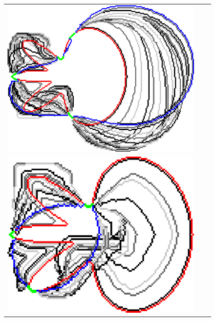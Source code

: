 \begin{figure}
\begin{tabular}{ccc}
\includegraphics[scale=0.25]{figures/chapter5/fixed-pixels/elastica/len_pen_0.001/flower-1/summary.pdf}\\[2em]
\includegraphics[scale=0.25]{figures/chapter5/fixed-pixels/elastica/len_pen_0.1/flower-2/summary.pdf} &

\end{tabular}
\end{figure}
